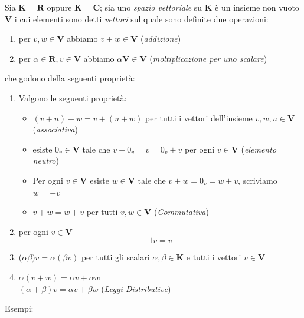 \documentclass[12pt]{article}
\begin{document}
    Sia $\mathbf{K} = \mathbf{R}$ oppure $\mathbf{K}= \mathbf{C}$; sia uno \textit{spazio vettoriale} su $\mathbf{K}$ è un insieme non vuoto $\mathbf{V}$ i cui elementi sono detti \textit{vettori} sul quale sono definite due operazioni:

\begin{enumerate}
    \item per $v, w \in \mathbf{V}$ abbiamo $v+w \in \mathbf{V}$ (\textit{addizione})
    \item per $\alpha \in \mathbf{R}, v \in \mathbf{V}$ abbiamo $\alpha \mathbf{V} \in \mathbf{V}$ (\textit{moltiplicazione per uno scalare})
\end{enumerate}
che godono della seguenti proprietà:
\begin{enumerate}
    \item Valgono le seguenti proprietà:
        \begin{itemize}
            \item $(v+u) + w = v + (u+w)$ per tutti i vettori dell'insieme $v, w , u \in \mathbf{V}$ (\textit{associativa})
            \item esiste $0_v \in \mathbf{V}$ tale che $v + 0_v = v = 0_v + v$ per ogni $v \in \mathbf{V}$ (\textit{elemento neutro})
            \item Per ogni $v \in \mathbf{V}$ esiste $w \in \mathbf{V}$ tale che $v+w = 0_v = w + v$, scriviamo $w = -v$
            \item $v+w = w+v$ per tutti $v, w \in \mathbf{V}$ (\textit{Commutativa})
        \end{itemize}
    \item per ogni $v \in \mathbf{V}$
        \[1v = v\]
    \item ($\alpha \beta)v = \alpha (\beta v)$ per tutti gli scalari $\alpha, \beta \in \mathbf{K}$ e tutti i vettori $v \in \mathbf{V}$
    \item $\alpha (v+w) = \alpha v + \alpha w$\\
    $(\alpha + \beta)v = \alpha v + \beta w$ (\textit{Leggi Distributive})
\end{enumerate}
Esempi:
\end{document}
